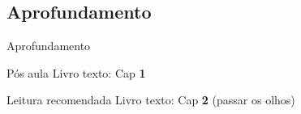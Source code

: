 \documentclass{beamer}
\begin{document}





\subsection{Aprofundamento}

\begin{frame}{\scriptsize Aprofundamento}
  \begin{block}{Pós aula}
    \footnotesize
    Livro texto: Cap {\bf 1}
  \end{block}
  \begin{block}{Leitura recomendada}
    \footnotesize
    Livro texto: Cap {\bf 2} (passar os olhos)
  \end{block}
\end{frame}
\end{document}
